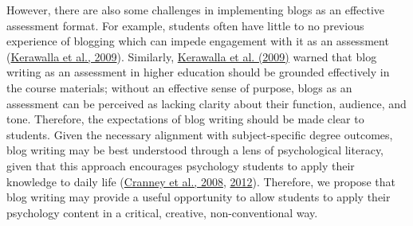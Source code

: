 \documentclass[
  11pt,
  letterpaper,
  oneside,
  open=any]{scrbook}
\begin{document}
However, there are also some challenges in implementing blogs as an
effective assessment format. For example, students often have little to
no previous experience of blogging which can impede engagement with it
as an assessment
(\href{https://journals-sagepub-com.gold.idm.oclc.org/doi/full/10.1177/00986283211027278\#bibr39-00986283211027278}{Kerawalla
et al., 2009}). Similarly,
\href{https://journals-sagepub-com.gold.idm.oclc.org/doi/full/10.1177/00986283211027278\#bibr39-00986283211027278}{Kerawalla
et al. (2009)} warned that blog writing as an assessment in higher
education should be grounded effectively in the course materials;
without an effective sense of purpose, blogs as an assessment can be
perceived as lacking clarity about their function, audience, and tone.
Therefore, the expectations of blog writing should be made clear to
students. Given the necessary alignment with subject-specific degree
outcomes, blog writing may be best understood through a lens of
psychological literacy, given that this approach encourages psychology
students to apply their knowledge to daily life
(\href{https://journals-sagepub-com.gold.idm.oclc.org/doi/full/10.1177/00986283211027278\#bibr17-00986283211027278}{Cranney
et al., 2008},
\href{https://journals-sagepub-com.gold.idm.oclc.org/doi/full/10.1177/00986283211027278\#bibr15-00986283211027278}{2012}).
Therefore, we propose that blog writing may provide a useful opportunity
to allow students to apply their psychology content in a critical,
creative, non-conventional way.
\end{document}
